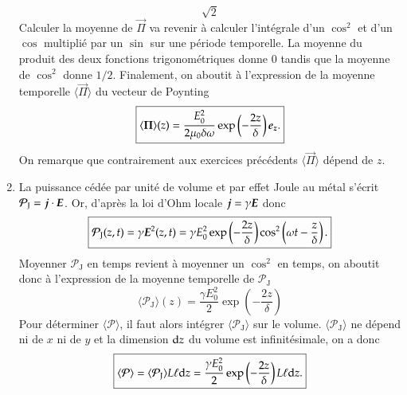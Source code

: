 \begin{corrige}
\begin{enumerate}
\begin{equation*}
			{\sqrt{2}}
	   \end{equation*}
	   Calculer la moyenne de $\vec{\Pi}$ va revenir à calculer l'intégrale
	   d'un $\cos^2$ et d'un $\cos$ multiplié par un $\sin$ sur une
	   période temporelle. La moyenne du produit des deux fonctions trigonométriques
	   donne $0$ tandis que la moyenne de $\cos^2$ donne $1/2$. Finalement, 
	   on aboutit à l'expression de la moyenne temporelle $\langle \vec{\Pi} \rangle$
	   du vecteur de Poynting
	   \begin{equation*}
		   \boxed{
			   \langle \vec{\Pi} \rangle(z) = \dfrac{E_0^2}{2 
			   \mu_0 \delta \omega}
		   	   \exp\left(-\dfrac{2z}{\delta}\right) \ez .
	   }
   	   \end{equation*}
	   On remarque que contrairement aux exercices précédents $\langle 
	   \vec{\Pi} \rangle$ dépend de $z$.
	   \item La puissance cédée par unité de volume et par effet Joule au métal
		 s'écrit $\mathcal{P}_\mathrm{J} = \vecj \cdot \vece$. Or, 
		 d'après la loi d'Ohm locale $\vecj = \gamma \vece$ donc
		 \begin{equation*}
			 \boxed{
				 \mathcal{P}_\mathrm{J}(z,t) = \gamma \vece^2(z,t)
			 = \gamma E_0^2 \exp\left(-\dfrac{2z}{\delta}\right)
			   \cos^2\left(\omega t - \dfrac{z}{\delta}\right).
		   }
	 	 \end{equation*}
		 Moyenner $\mathcal{P}_\mathrm{J}$ en temps revient à moyenner
		 un $\cos^2$ en temps, on aboutit donc à l'expression de la 
		 moyenne temporelle de $\mathcal{P}_\mathrm{J}$
		 \begin{equation*}
			 \boxed{
				 \langle \mathcal{P}_\mathrm{J} \rangle(z) = 
				\dfrac{\gamma E_0^2}{2}\exp
				\left(-\dfrac{2z}{\delta}\right)
			}
		\end{equation*}
		Pour déterminer $\langle \mathcal{P} \rangle$, il faut alors intégrer 
		$\langle \mathcal{P}_\mathrm{J} \rangle$ sur le volume. 
		$\langle \mathcal{P}_\mathrm{J} \rangle$ ne dépend ni de $x$
		ni de $y$ et la dimension $\mathrm{d}z$ du volume est infinitésimale, 
		on a donc
		\begin{equation*}
			\boxed{
				\langle \mathcal{P} \rangle = \langle 
				\mathcal{P}_\mathrm{J} \rangle
				L \ell \mathrm{d}z
				=\dfrac{\gamma E_0^2}{2} 
		      \exp\left(-\dfrac{2z}{\delta}\right) L \ell \mathrm{d}z.
		}
		\end{equation*}


\end{enumerate}
\end{corrige}
